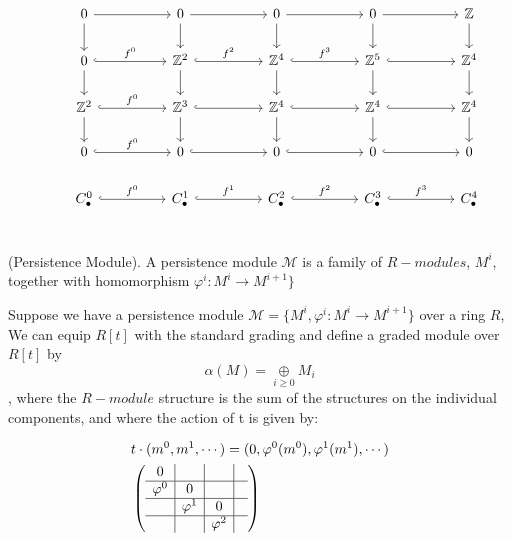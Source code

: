 \documentclass[11pt,a4paper]{report}
\begin{document}
\begin{Ex}
              \[
                \begin{tikzcd}[ampersand replacement=\&]
                  \& 0 \arrow[rr] \arrow[d]                      \&\& 0 \arrow[rr] \arrow[d]                                \&\& 0 \arrow[rr] \arrow[d]                            \&\& 0 \arrow[rr] \arrow[d]                            \&\& \mathbb{Z} \arrow[d]\\
                  \& 0 \arrow[hookrightarrow]{rr}{f^0} \arrow[d] \&\& \mathbb{Z}^2 \arrow[hookrightarrow]{rr}{f^2} \arrow[d] \&\& \mathbb{Z}^4 \arrow[hookrightarrow]{rr}{f^3} \arrow[d] \&\& \mathbb{Z}^5 \arrow[d] \arrow[hookrightarrow]{rr} \&\& \mathbb{Z}^4 \arrow[d]\\
                  \& \mathbb{Z}^2 \arrow[hookrightarrow]{rr}{f^0} \arrow[d] \&\& \mathbb{Z}^3 \arrow[hookrightarrow]{rr} \arrow[d] \&\& \mathbb{Z}^4 \arrow[hookrightarrow]{rr} \arrow[d] \&\& \mathbb{Z}^4 \arrow[d] \arrow[hookrightarrow]{rr} \&\& \mathbb{Z}^4 \arrow[d]\\
                  \& 0 \arrow[hookrightarrow]{rr}{f^0}           \&\& 0 \arrow[hookrightarrow]{rr}         \&\& 0 \arrow[hookrightarrow]{rr}          \&\& 0 \arrow[hookrightarrow]{rr} \&\& 0 \\
                  \& C_\bullet^0 \arrow[hookrightarrow]{rr}{f^0}       \&\& C_\bullet^1 \arrow[hookrightarrow]{rr}{f^1} \&\& C_\bullet^2 \arrow[hookrightarrow]{rr}{f^2} \&\& C_\bullet^3 \arrow[hookrightarrow]{rr}{f^3} \&\& C_\bullet^4 \\
                \end{tikzcd}
              \]
             \end{Ex}

             \begin{defn} (Persistence Module). A persistence module $\mathcal{M}$ is a family of $R-modules$, $M^i$, together
             with homomorphism $\varphi^i: M^i \rightarrow M^{i+1}\}$
             \end{defn}

             Suppose we have a persistence module  $\mathcal{M} = \{M^i, \varphi^i: M^i \rightarrow M^{i+1}\}$ over a
             ring $R$, We can equip $R[t]$ with the standard grading and define a graded module over $R[t]$ by
                \[ \alpha(M) = \underset{i \ge 0}{\oplus} M_i \],
                where the $R-module$ structure is the sum of the structures on the individual components, and where the action of t is given by:

              \begin{align*}
                &t \cdot(m^0,m^1, \cdots) = (0, \varphi^0(m^0), \varphi^1(m^1), \cdots)\\
                &\left(\begin{array}{c|c|c|c}
                        0 &&& \\ \hline \varphi^0 & 0 && \\ \hline & \varphi^1 & 0 & \\ \hline && \varphi^2 &
                      \end{array}\right)
              \end{align*}
\end{document}
